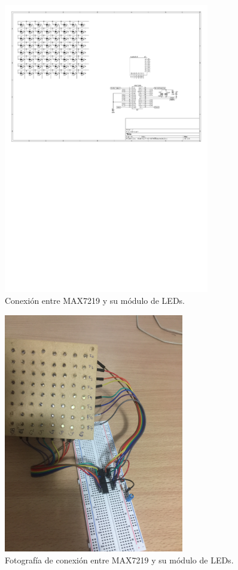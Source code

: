 \begin{figure}[htp!]
\centering
\begin{center}
	\includegraphics[width=0.8\textwidth]{imagenes/hw/conexion-MAX-matriz.pdf}
	\caption{Conexión entre MAX7219 y su módulo de LEDs.}
	\label{fig:MAX-matriz}
\end{center}
\end{figure}

\begin{figure}[htp!]
\centering
\begin{center}
	\includegraphics[width=0.7\textwidth]{imagenes/hw/conexion-MAX-matriz.JPG}
	\caption{Fotografía de conexión entre MAX7219 y su módulo de LEDs.}
	\label{fig:MAX-matriz-real}
\end{center}
\end{figure}


